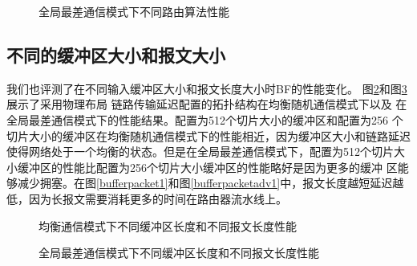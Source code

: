    \begin{figure}[t]
\setlength{\belowcaptionskip}{-.5cm}%
  \centering
 \begin{minipage}[t]{\textwidth}
   \centering
  \vspace{-.3cm}
  \caption{全局最差通信模式下不同路由算法性能}
  \label{l1ra02}
  \end{minipage}
  \end{figure}

  \subsection{不同的缓冲区大小和报文大小}

  我们也评测了在不同输入缓冲区大小和报文长度大小时BF的性能变化。
  图\ref{bufferpacket}和图\ref{bufferpacketadv}展示了采用物理布局
  链路传输延迟配置的拓扑结构在均衡随机通信模式下以及
  在全局最差通信模式下的性能结果。配置为512个切片大小的缓冲区和配置为256 个切片大小的缓冲区在均衡随机通信模式下的性能相近，因为缓冲区大小和链路延迟使得网络处于一个均衡的状态。但是在全局最差通信模式下，配置为512个切片大小缓冲区的性能比配置为256个切片大小缓冲区的性能略好是因为更多的缓冲
  区能够减少拥塞。在图\ref{bufferpacket1}和图\ref{bufferpacketadv1}中，报文长度越短延迟越低，因为长报文需要消耗更多的时间在路由器流水线上。


     \begin{figure}[t]
\setlength{\belowcaptionskip}{-.5cm}%
  \centering
 \begin{minipage}[t]{\textwidth}
   \centering
  \vspace{-.3cm}
  \caption{均衡通信模式下不同缓冲区长度和不同报文长度性能}
  \label{bufferpacket}
  \end{minipage}
  \end{figure}

 \begin{figure}[t]
\setlength{\belowcaptionskip}{-.5cm}%
  \centering
 \begin{minipage}[t]{\textwidth}
   \centering
  \vspace{-.3cm}
  \caption{全局最差通信模式下不同缓冲区长度和不同报文长度性能}
  \label{bufferpacketadv}
  \end{minipage}
  \end{figure}

